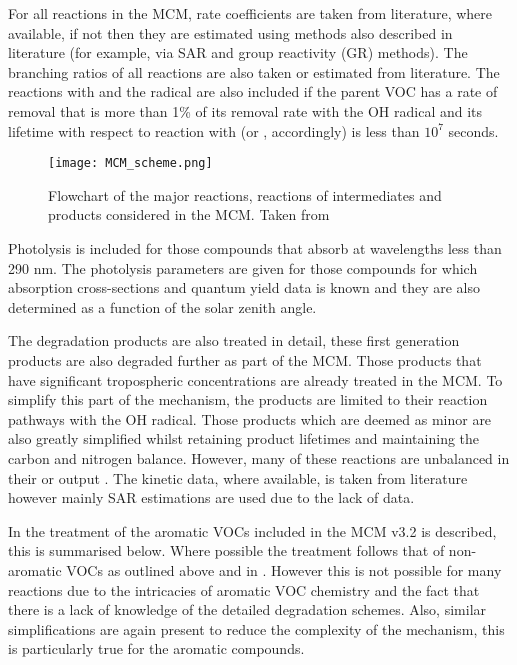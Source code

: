 For all reactions in the MCM, rate coefficients are taken from literature, where available, if not then they are estimated using methods also described in literature (for example, via SAR and group reactivity (GR) methods). 
The branching ratios of all reactions are also taken or estimated from literature. 
The reactions with  and the  radical are also included if the parent VOC has a rate of removal that is more than 1\% of its removal rate with the OH radical and its lifetime with respect to reaction with  (or , accordingly) is less than $10^7$ seconds.
\begin{figure}
    \begin{center}
        \texttt{[image: MCM\_scheme.png]}
        \caption{Flowchart of the major reactions, reactions of intermediates and products considered in the MCM. Taken from \citep{Saunders:2003}}
        \label{f:MCM_scheme}
    \end{center}
\end{figure}

Photolysis is included for those compounds that absorb at wavelengths less than 290 nm. 
The photolysis parameters are given for those  compounds for which absorption cross-sections and quantum yield data is known and they are also determined as a function of the solar zenith angle. 

The degradation products are also treated in detail, these first generation products are also degraded further as part of the MCM. 
Those products that have significant tropospheric concentrations are already treated in the MCM. 
To simplify this part of the mechanism, the products are limited to their reaction pathways with the OH radical. 
Those products which are deemed as minor are also greatly simplified whilst retaining product lifetimes and maintaining the carbon and nitrogen balance. 
However, many of these reactions are unbalanced in their  or  output \citep{Jenkin:1997}. 
The kinetic data, where available, is taken from literature however mainly SAR estimations are used due to the lack of data.

In \citep{Jenkin:2003} the treatment of the aromatic VOCs included in the MCM v3.2 is described, this is summarised below. 
Where possible the treatment follows that of non-aromatic VOCs as outlined above and in \citep{Saunders:2003}. 
However this is not possible for many reactions due to the intricacies of aromatic VOC chemistry and the fact that there is a lack of knowledge of the detailed degradation schemes. 
Also, similar simplifications are again present to reduce the complexity of the mechanism, this is particularly true for the  aromatic compounds.

